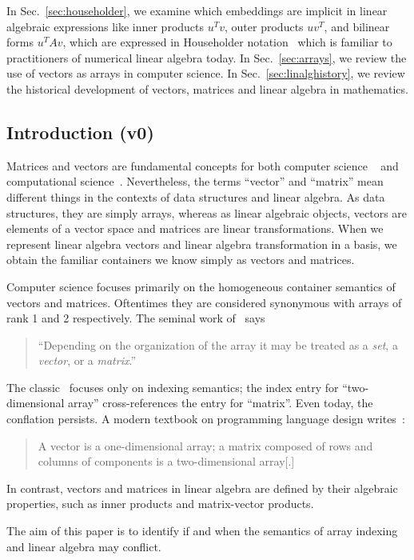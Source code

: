 In Sec.~\ref{sec:householder}, we examine which embeddings are implicit in linear algebraic expressions like inner products $u^T v$, outer products $u v^T$, and bilinear forms $u^T A v$, which are expressed in Householder notation~\cite{Householder1953,Householder1955} which is familiar to practitioners of numerical linear algebra today.
In Sec.~\ref{sec:arrays}, we review the use of vectors as arrays in computer science.
In Sec.~\ref{sec:linalghistory}, we review the historical development of vectors, matrices and linear algebra in mathematics.


\subsection{Introduction (v0)}

Matrices and vectors are fundamental concepts for both computer science
~\cite{Knuth1967,Pratt2001} and computational
science~\cite{Strang2003,Trefethen1997}. Nevertheless, the terms ``vector'' and
``matrix'' mean different things in the contexts of data structures and linear
algebra. As data structures, they are simply arrays, whereas as linear
algebraic objects, vectors are elements of a vector space and matrices are linear transformations.
When we represent linear algebra vectors and linear algebra transformation in a basis,
we obtain the familiar containers we know simply as vectors and matrices.



Computer science focuses primarily on the homogeneous container semantics of
vectors and matrices. Oftentimes they are considered synonymous with arrays of
rank 1 and 2 respectively. The seminal work of~\cite{Iliffe1961} says
%
\begin{quote}
``Depending on the organization of the array it may
be treated as a \textit{set}, a \textit{vector}, or a \textit{matrix}.''
\end{quote}
%
The classic~\cite{Knuth1967} focuses only on indexing semantics; the index
entry for ``two-dimensional array'' cross-references the entry for ``matrix''.
Even today, the conflation persists. A modern textbook on programming language
design writes~\cite[p. 215]{Pratt2001}:
%
\begin{quote}
A vector is a one-dimensional array; a matrix composed of rows and columns of
components is a two-dimensional array[.]
\end{quote}


In contrast, vectors and matrices in linear algebra are defined by their
algebraic properties, such as inner products and matrix-vector products.

The aim of this paper is to identify if and when the semantics of array
indexing and linear algebra may conflict.
